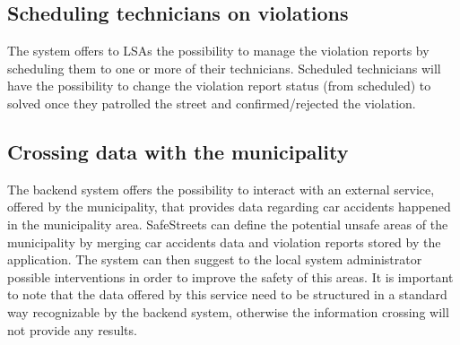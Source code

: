 \subsection{Scheduling technicians on violations}
The system offers to LSAs the possibility to manage the violation reports by scheduling them to one or more of their technicians.
Scheduled technicians will have the possibility to change the violation report status (from scheduled) to solved once they patrolled the street and confirmed/rejected the violation.

\subsection{Crossing data with the municipality}
The backend system offers the possibility to interact with an external service, offered by the municipality, that provides data regarding car accidents happened in the municipality area. SafeStreets can define the potential unsafe areas of the municipality by merging car accidents data and violation reports stored by the application. The system can then suggest to the local system administrator possible interventions in order to improve the safety of this areas. It is important to note that the data offered by this service need to be structured in a standard way recognizable by the backend system, otherwise the information crossing will not provide any results.

